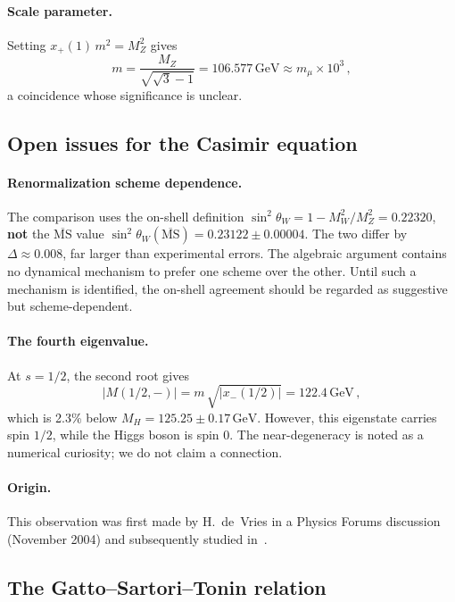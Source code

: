 \documentclass[12pt,a4paper]{article}
\newcommand{\GeV}{\,\text{GeV}}
\begin{document}
\paragraph{Scale parameter.}
Setting $x_+(1)\,m^2 = M_Z^2$ gives
\begin{equation}
m = \frac{M_Z}{\sqrt{\sqrt{3} - 1}}
  = 106.577\GeV
  \approx m_\mu \times 10^3\,,
\end{equation}
a coincidence whose significance is unclear.

\subsection{Open issues for the Casimir equation}

\paragraph{Renormalization scheme dependence.}
The comparison uses the on-shell
definition $\sin^2\!\theta_W = 1 - M_W^2/M_Z^2 = 0.22320$,
\textbf{not} the $\overline{\text{MS}}$ value
$\sin^2\!\theta_W(\overline{\text{MS}}) = 0.23122 \pm 0.00004$.
The two differ by $\Delta \approx 0.008$, far larger than
experimental errors.  The algebraic argument
contains no dynamical mechanism to
prefer one scheme over the other.  Until such a mechanism is
identified, the on-shell agreement should be regarded as
suggestive but scheme-dependent.

\paragraph{The fourth eigenvalue.}
At $s = 1/2$, the second root gives
\begin{equation}
|M(1/2, -)|
  = m\,\sqrt{|x_-(1/2)|}
  = 122.4\GeV\,,
\end{equation}
which is 2.3\% below $M_H = 125.25 \pm 0.17\GeV$.  However,
this eigenstate carries spin $1/2$, while the Higgs boson is
spin $0$.  The near-degeneracy is noted as a numerical curiosity;
we do not claim a connection.

\paragraph{Origin.}
This observation was first made by H.~de~Vries in a Physics
Forums discussion (November 2004) and subsequently studied in~\cite{Rivero2005b}.

\subsection{The Gatto--Sartori--Tonin relation}
\end{document}
